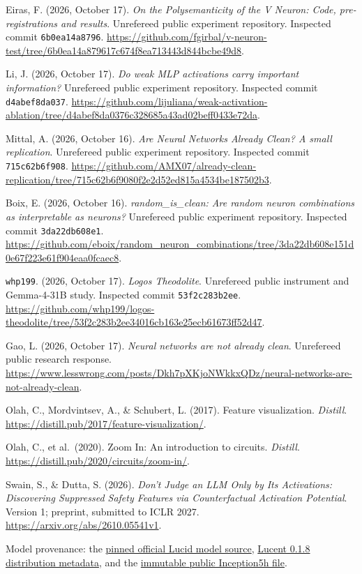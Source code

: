 \documentclass[
  british,
  11pt,
  a4paper,
]{article}
\begin{document}
Eiras, F. (2026, October 17). \emph{On the Polysemanticity of the V
Neuron: Code, pre-registrations and results}. Unrefereed public
experiment repository. Inspected commit \texttt{6b0ea14a8796}.
\url{https://github.com/fgirbal/v-neuron-test/tree/6b0ea14a879617c674f8ea713443d844bcbe49d8}.

Li, J. (2026, October 17). \emph{Do weak MLP activations carry important
information?} Unrefereed public experiment repository. Inspected commit
\texttt{d4abef8da037}.
\url{https://github.com/lijuliana/weak-activation-ablation/tree/d4abef8da0376c328685a43ad02beff0433e72da}.

Mittal, A. (2026, October 16). \emph{Are Neural Networks Already Clean?
A small replication}. Unrefereed public experiment repository. Inspected
commit \texttt{715c62b6f908}.
\url{https://github.com/AMX07/already-clean-replication/tree/715c62b6f9080f2e2d52ed815a4534be187502b3}.

Boix, E. (2026, October 16). \emph{random\_is\_clean: Are random neuron
combinations as interpretable as neurons?} Unrefereed public experiment
repository. Inspected commit \texttt{3da22db608e1}.
\url{https://github.com/eboix/random_neuron_combinations/tree/3da22db608e151d0e67f223e61f904eaa0fcaec8}.

\texttt{whp199}. (2026, October 17). \emph{Logos Theodolite}. Unrefereed
public instrument and Gemma-4-31B study. Inspected commit
\texttt{53f2c283b2ee}.
\url{https://github.com/whp199/logos-theodolite/tree/53f2c283b2ee34016cb163e25ecb61673ff52d47}.

Gao, L. (2026, October 17). \emph{Neural networks are not already
clean}. Unrefereed public research response.
\url{https://www.lesswrong.com/posts/Dkh7pXKjoNWkkxQDz/neural-networks-are-not-already-clean}.

Olah, C., Mordvintsev, A., \& Schubert, L. (2017). Feature
visualization. \emph{Distill}.
\url{https://distill.pub/2017/feature-visualization/}.

Olah, C., et al.~(2020). Zoom In: An introduction to circuits.
\emph{Distill}. \url{https://distill.pub/2020/circuits/zoom-in/}.

Swain, S., \& Dutta, S. (2026). \emph{Don't Judge an LLM Only by Its
Activations: Discovering Suppressed Safety Features via Counterfactual
Activation Potential}. Version 1; preprint, submitted to ICLR 2027.
\url{https://arxiv.org/abs/2610.05541v1}.

Model provenance: the
\href{https://github.com/tensorflow/lucid/blob/6dcc927e4ff4e7ef4d9c54d27b0352849dadd1bb/lucid/modelzoo/other_models/InceptionV1.py}{pinned
official Lucid model source},
\href{https://pypi.org/pypi/torch-lucent/0.1.8/json}{Lucent 0.1.8
distribution metadata}, and the
\href{https://github.com/ProGamerGov/pytorch-old-tensorflow-models/blob/f8187b60fca8a3f5cfa541406dcbcefb80db5c78/inception5h.pth}{immutable
public Inception5h file}.
\end{document}
